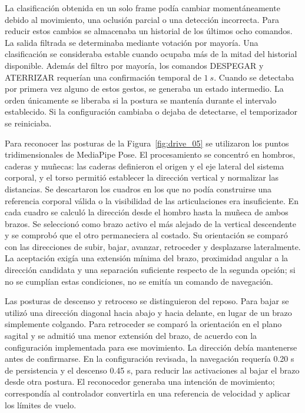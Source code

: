 La clasificación obtenida en un solo frame podía cambiar momentáneamente debido al movimiento, una oclusión parcial o una detección incorrecta. Para reducir estos cambios se almacenaba un historial de los últimos ocho comandos. La salida filtrada se determinaba mediante votación por mayoría. Una clasificación se consideraba estable cuando ocupaba más de la mitad del historial disponible. Además del filtro por mayoría, los comandos DESPEGAR y ATERRIZAR requerían una confirmación temporal de $1\ s$. Cuando se detectaba por primera vez alguno de estos gestos, se generaba un estado intermedio. La orden únicamente se liberaba si la postura se mantenía durante el intervalo establecido. Si la configuración cambiaba o dejaba de detectarse, el temporizador se reiniciaba.

Para reconocer las posturas de la Figura~\ref{fig:drive_05} se utilizaron los puntos tridimensionales de MediaPipe Pose. El procesamiento se concentró en hombros, caderas y muñecas: las caderas definieron el origen y el eje lateral del sistema corporal, y el torso permitió establecer la dirección vertical y normalizar las distancias. Se descartaron los cuadros en los que no podía construirse una referencia corporal válida o la visibilidad de las articulaciones era insuficiente. En cada cuadro se calculó la dirección desde el hombro hasta la muñeca de ambos brazos. Se seleccionó como brazo activo el más alejado de la vertical descendente y se comprobó que el otro permaneciera al costado. Su orientación se comparó con las direcciones de subir, bajar, avanzar, retroceder y desplazarse lateralmente. La aceptación exigía una extensión mínima del brazo, proximidad angular a la dirección candidata y una separación suficiente respecto de la segunda opción; si no se cumplían estas condiciones, no se emitía un comando de navegación.

Las posturas de descenso y retroceso se distinguieron del reposo. Para bajar se utilizó una dirección diagonal hacia abajo y hacia delante, en lugar de un brazo simplemente colgando. Para retroceder se comparó la orientación en el plano sagital y se admitió una menor extensión del brazo, de acuerdo con la configuración implementada para ese movimiento. La dirección debía mantenerse antes de confirmarse. En la configuración revisada, la navegación requería 0.20 s de persistencia y el descenso 0.45 s, para reducir las activaciones al bajar el brazo desde otra postura. El reconocedor generaba una intención de movimiento; correspondía al controlador convertirla en una referencia de velocidad y aplicar los límites de vuelo.

